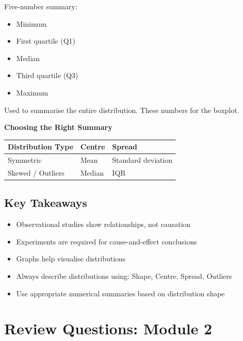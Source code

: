 \documentclass[
  11pt,
  oneside]{scrbook}
\newcounter{none} %
\providecommand{\tightlist}{%
  \setlength{\itemsep}{0pt}\setlength{\parskip}{0pt}}
\begin{document}
Five-number summary:

\begin{itemize}
\tightlist
\item
  Minimum\\
\item
  First quartile (Q1)\\
\item
  Median\\
\item
  Third quartile (Q3)\\
\item
  Maximum
\end{itemize}

Used to summarise the entire distribution. These numbers for the boxplot.

\textbf{Choosing the Right Summary}

{\def\LTcaptype{none} %
\begin{longtable}[]{@{}lll@{}}
\toprule\noalign{}
Distribution Type & Centre & Spread \\
\midrule\noalign{}
\endhead
\bottomrule\noalign{}
\endlastfoot
Symmetric & Mean & Standard deviation \\
Skewed / Outliers & Median & IQR \\
\end{longtable}
}

\section{Key Takeaways}\label{key-takeaways}

\begin{itemize}
\tightlist
\item
  Observational studies show relationships, not causation\\
\item
  Experiments are required for cause-and-effect conclusions\\
\item
  Graphs help visualise distributions\\
\item
  Always describe distributions using: Shape, Centre, Spread, Outliers\\
\item
  Use appropriate numerical summaries based on distribution shape
\end{itemize}

\chapter*{Review Questions: Module 2}\label{review-questions-module-2}
\end{document}
